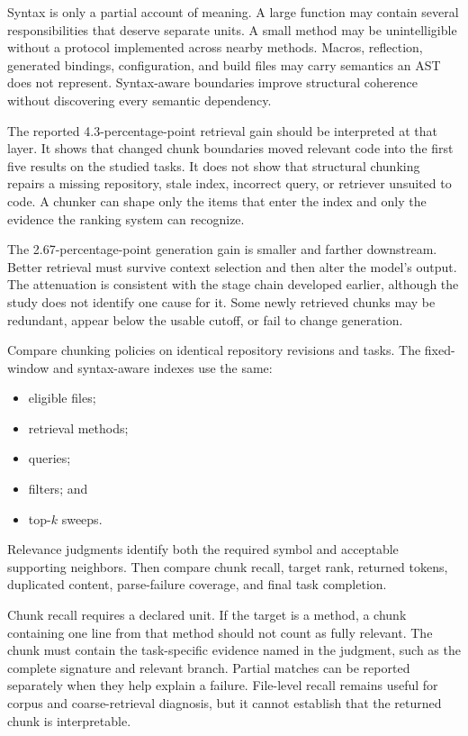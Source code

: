 Syntax is only a partial account of meaning. A large function may contain several responsibilities that deserve separate units. A small method may be unintelligible without a protocol implemented across nearby methods. Macros, reflection, generated bindings, configuration, and build files may carry semantics an AST does not represent. Syntax-aware boundaries improve structural coherence without discovering every semantic dependency.

The reported 4.3-percentage-point retrieval gain should be interpreted at that layer. It shows that changed chunk boundaries moved relevant code into the first five results on the studied tasks. It does not show that structural chunking repairs a missing repository, stale index, incorrect query, or retriever unsuited to code. A chunker can shape only the items that enter the index and only the evidence the ranking system can recognize.

The 2.67-percentage-point generation gain is smaller and farther downstream. Better retrieval must survive context selection and then alter the model's output. The attenuation is consistent with the stage chain developed earlier, although the study does not identify one cause for it. Some newly retrieved chunks may be redundant, appear below the usable cutoff, or fail to change generation.


Compare chunking policies on identical repository revisions and tasks. The fixed-window and syntax-aware indexes use the same:

\begin{itemize}
\tightlist
\item
  eligible files;
\item
  retrieval methods;
\item
  queries;
\item
  filters; and
\item
  top-\(k\) sweeps.
\end{itemize}

Relevance judgments identify both the required symbol and acceptable supporting neighbors. Then compare chunk recall, target rank, returned tokens, duplicated content, parse-failure coverage, and final task completion.

Chunk recall requires a declared unit. If the target is a method, a chunk containing one line from that method should not count as fully relevant. The chunk must contain the task-specific evidence named in the judgment, such as the complete signature and relevant branch. Partial matches can be reported separately when they help explain a failure. File-level recall remains useful for corpus and coarse-retrieval diagnosis, but it cannot establish that the returned chunk is interpretable.

